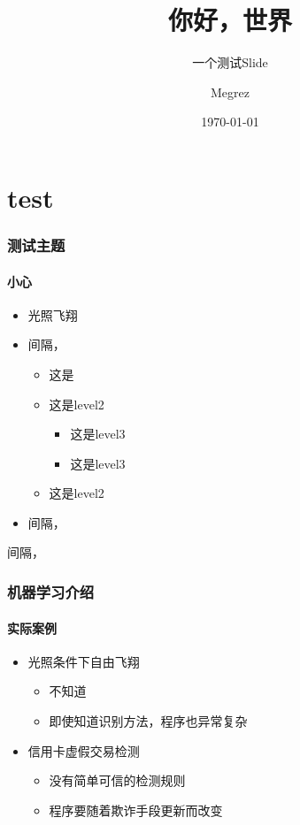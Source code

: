\documentclass[t,12pt]{beamer}
\begin{document}
\title{你好，世界}
\subtitle{\longdash 一个测试Slide}
\author[del2z]{Megrez}
\date{\today}

\begin{frame}
\titlepage
\end{frame}

\section{test}
\begin{frame}
\frametitle{测试主题}
\framesubtitle{小心}

\begin{itemize}
  \item<1-> 光照飞翔 \\
  \item<2-> 间隔\the\itemsep，\\
  \begin{itemize}
    \item 这是\the\itemsep
    \item 这是level2 \\
    \begin{itemize}
      \item 这是level3
      \item 这是level3
    \end{itemize}
    \item 这是level2
  \end{itemize}
  \item<2-> 间隔\the\itemsep，
  \end{itemize}
  间隔\the\itemsep，
\end{frame}

\begin{frame}
\frametitle{机器学习介绍}
\framesubtitle{实际案例}

\begin{itemize}
  \item<1-> 光照{条件下自由}飞翔 \\
  \begin{itemize}
    \item 不知道\the\itemsep
    \item 即使知道识别方法，程序也异常复杂
  \end{itemize}
  \item<2-> 信用卡虚假交易检测
  \begin{itemize}
    \item 没有简单可信的检测规则
    \item 程序要随着欺诈手段更新而改变
  \end{itemize}
\end{itemize}
\end{frame}
\end{document}
